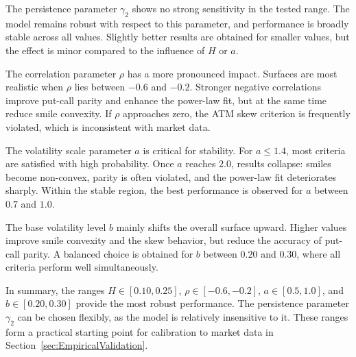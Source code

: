 The persistence parameter $\gamma_2$ shows no strong sensitivity in the tested range. The model remains robust with respect to this parameter, and performance is broadly stable across all values. Slightly better results are obtained for smaller values, but the effect is minor compared to the influence of $H$ or $a$.  

The correlation parameter $\rho$ has a more pronounced impact. Surfaces are most realistic when $\rho$ lies between $-0.6$ and $-0.2$. Stronger negative correlations improve put-call parity and enhance the power-law fit, but at the same time reduce smile convexity. If $\rho$ approaches zero, the ATM skew criterion is frequently violated, which is inconsistent with market data.  

The volatility scale parameter $a$ is critical for stability. For $a \leq 1.4$, most criteria are satisfied with high probability. Once $a$ reaches $2.0$, results collapse: smiles become non-convex, parity is often violated, and the power-law fit deteriorates sharply. Within the stable region, the best performance is observed for $a$ between $0.7$ and $1.0$.

The base volatility level $b$ mainly shifts the overall surface upward. Higher values improve smile convexity and the skew behavior, but reduce the accuracy of put-call parity. A balanced choice is obtained for $b$ between $0.20$ and $0.30$, where all criteria perform well simultaneously.  

In summary, the ranges $H \in [0.10, 0.25]$, $\rho \in [-0.6, -0.2]$, $a \in [0.5, 1.0]$, and $b \in [0.20, 0.30]$ provide the most robust performance. The persistence parameter $\gamma_2$ can be chosen flexibly, as the model is relatively insensitive to it. These ranges form a practical starting point for calibration to market data in Section~\ref{sec:EmpiricalValidation}.

